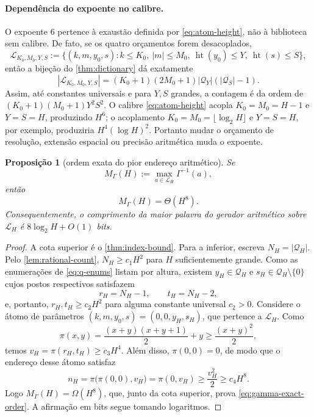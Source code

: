 \documentclass[11pt,a4paper]{article}
\newtheorem{proposition}[theorem]{Proposição}
\theoremstyle{definition}
\theoremstyle{remark}
\newcommand{\Library}{\mathcal{L}}
\newcommand{\height}{\operatorname{ht}}
\begin{document}
\paragraph{Dependência do expoente no calibre.}
O expoente $6$ pertence à exaustão definida por \eqref{eq:atom-height}, não à
biblioteca sem calibre. De fato, se os quatro orçamentos forem desacoplados,
\[
 \Library_{K_0,M_0,Y,S}
 :=\{(k,m,y_0,s):k\le K_0,\ |m|\le M_0,
       \ \height(y_0)\le Y,\ \height(s)\le S\},
\]
então a bijeção do \cref{thm:dictionary} dá exatamente
\[
 |\Library_{K_0,M_0,Y,S}|
 =(K_0+1)(2M_0+1)|\mathcal Q_Y|
   (|\mathcal Q_S|-1).
\]
Assim, até constantes universais e para $Y,S$ grandes, a contagem é da ordem
de $(K_0+1)(M_0+1)Y^2S^2$. O calibre
\eqref{eq:atom-height} acopla $K_0=M_0=H-1$ e $Y=S=H$, produzindo $H^6$;
o acoplamento $K_0=M_0=\lfloor\log_2H\rfloor$ e $Y=S=H$, por exemplo,
produziria $H^4(\log H)^2$. Portanto mudar o orçamento de resolução, extensão
espacial ou precisão aritmética muda o expoente.

\begin{proposition}[ordem exata do pior endereço aritmético]
\label{prop:gamma-exact-order}
Se
\[
 M_\Gamma(H):=\max_{a\in\Library_H}\Gamma^{-1}(a),
\]
então
\begin{equation}
 M_\Gamma(H)=\Theta(H^8).
 \label{eq:gamma-exact-order}
\end{equation}
Consequentemente, o comprimento da maior palavra do gerador aritmético sobre
$\Library_H$ é $8\log_2H+O(1)$ bits.
\end{proposition}

\begin{proof}
A cota superior é o \cref{thm:index-bound}. Para a inferior, escreva
$N_H=|\mathcal Q_H|$. Pelo \cref{lem:rational-count}, $N_H\ge c_1H^2$ para
$H$ suficientemente grande. Como as enumerações de \eqref{eq:q-enums} listam
por altura, existem $y_H\in\mathcal Q_H$ e
$s_H\in\mathcal Q_H\setminus\{0\}$ cujos postos respectivos satisfazem
\[
 r_H=N_H-1,\qquad t_H=N_H-2,
\]
e, portanto, $r_H,t_H\ge c_2H^2$ para alguma constante universal $c_2>0$.
Considere o átomo de parâmetros $(k,m,y_0,s)=(0,0,y_H,s_H)$, que pertence a
$\Library_H$. Como
\[
 \pi(x,y)=\frac{(x+y)(x+y+1)}2+y\ge\frac{(x+y)^2}{2},
\]
temos $v_H=\pi(r_H,t_H)\ge c_3H^4$. Além disso,
$\pi(0,0)=0$, de modo que o endereço desse átomo satisfaz
\[
 n_H=\pi\bigl(\pi(0,0),v_H\bigr)=\pi(0,v_H)
 \ge\frac{v_H^2}{2}\ge c_4H^8.
\]
Logo $M_\Gamma(H)=\Omega(H^8)$, que, junto da cota superior, prova
\eqref{eq:gamma-exact-order}. A afirmação em bits segue tomando logaritmos.
\end{proof}
\end{document}
